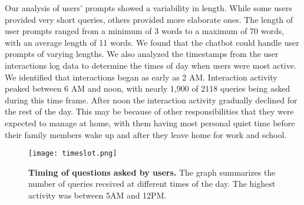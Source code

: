 Our analysis of users' prompts showed a variability in length. While some users provided very short queries, others provided more elaborate ones. The length of user prompts ranged from a minimum of 3 words to a maximum of 70 words, with an average length of 11 words. We found that the chatbot could handle user prompts of varying lengths.
We also analyzed the timestamps from the user interactions log data to determine the times of day when users were most active. We identified that interactions began as early as 2 AM. Interaction activity peaked between 6 AM and noon, with nearly 1,900 of 2118 queries being asked during this time frame. After noon the interaction activity gradually declined for the rest of the day. This may be because of other responsibilities that they were expected to manage at home, with them having most personal quiet time before their family members wake up and after they leave home for work and school.


% 

\begin{figure}[h]
  \centering
  \texttt{[image: timeslot.png]} 
  \caption{\textbf{Timing of questions asked by users.} The graph summarizes the number of queries received at different times of the day. The highest activity was between 5AM and 12PM.}
  \label{fig:timeslot}
\end{figure}

